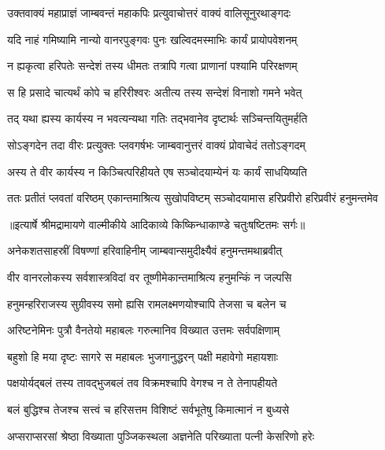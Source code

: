 \twolineshloka
{उक्तवाक्यं महाप्राज्ञं जाम्बवन्तं महाकपिः}
{प्रत्युवाचोत्तरं वाक्यं वालिसूनुरथाङ्गदः} %

\twolineshloka
{यदि नाहं गमिष्यामि नान्यो वानरपुङ्गवः}
{पुनः खल्विदमस्माभिः कार्यं प्रायोपवेशनम्} %

\twolineshloka
{न ह्यकृत्वा हरिपतेः सन्देशं तस्य धीमतः}
{तत्रापि गत्वा प्राणानां पश्यामि परिरक्षणम्} %

\twolineshloka
{स हि प्रसादे चात्यर्थं कोपे च हरिरीश्वरः}
{अतीत्य तस्य सन्देशं विनाशो गमने भवेत्} %

\twolineshloka
{तद् यथा ह्यस्य कार्यस्य न भवत्यन्यथा गतिः}
{तद्भवानेव दृष्टार्थः सञ्चिन्तयितुमर्हति} %

\twolineshloka
{सोऽङ्गदेन तदा वीरः प्रत्युक्तः प्लवगर्षभः}
{जाम्बवानुत्तरं वाक्यं प्रोवाचेदं ततोऽङ्गदम्} %

\twolineshloka
{अस्य ते वीर कार्यस्य न किञ्चित्परिहीयते}
{एष सञ्चोदयाम्येनं यः कार्यं साधयिष्यति} %

\fourlineindentedshloka
{ततः प्रतीतं प्लवतां वरिष्ठम्}
{एकान्तमाश्रित्य सुखोपविष्टम्}
{सञ्चोदयामास हरिप्रवीरो}
{हरिप्रवीरं हनुमन्तमेव} %


{॥इत्यार्षे श्रीमद्रामायणे वाल्मीकीये आदिकाव्ये किष्किन्धाकाण्डे चतुःषष्टितमः सर्गः॥}


\twolineshloka
{अनेकशतसाहस्रीं विषण्णां हरिवाहिनीम्}
{जाम्बवान्समुदीक्ष्यैवं हनुमन्तमथाब्रवीत्} %

\twolineshloka
{वीर वानरलोकस्य सर्वशास्त्रविदां वर}
{तूष्णीमेकान्तमाश्रित्य हनुमन्किं न जल्पसि} %

\twolineshloka
{हनुमन्हरिराजस्य सुग्रीवस्य समो ह्यसि}
{रामलक्ष्मणयोश्चापि तेजसा च बलेन च} %

\twolineshloka
{अरिष्टनेमिनः पुत्रौ वैनतेयो महाबलः}
{गरुत्मानिव विख्यात उत्तमः सर्वपक्षिणाम्} %

\twolineshloka
{बहुशो हि मया दृष्टः सागरे स महाबलः}
{भुजगानुद्धरन् पक्षी महावेगो महायशाः} %

\twolineshloka
{पक्षयोर्यद्बलं तस्य तावद्भुजबलं तव}
{विक्रमश्चापि वेगश्च न ते तेनापहीयते} %

\twolineshloka
{बलं बुद्धिश्च तेजश्च सत्त्वं च हरिसत्तम}
{विशिष्टं सर्वभूतेषु किमात्मानं न बुध्यसे} %

\twolineshloka
{अप्सराप्सरसां श्रेष्ठा विख्याता पुञ्जिकस्थला}
{अज्ञनेति परिख्याता पत्नी केसरिणो हरेः} %

